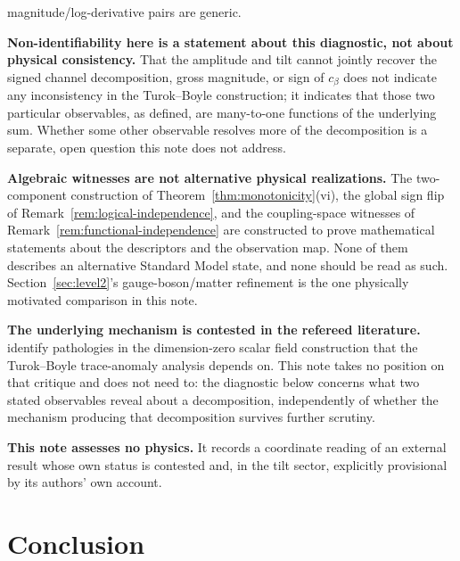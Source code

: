 \documentclass[11pt]{article}
\theoremstyle{definition}
\theoremstyle{remark}
\begin{document}
\begin{description}
magnitude/log-derivative pairs are generic.
\item[\textbf{(L7)}] \textbf{Non-identifiability here is a statement about this diagnostic, not
about physical consistency.} That the amplitude
and tilt cannot jointly recover the signed channel decomposition, gross magnitude, or sign of
$c_\beta$ does not indicate any inconsistency in the Turok--Boyle construction; it indicates that
those two particular observables, as defined, are many-to-one functions of the underlying sum.
Whether some other observable resolves more of the decomposition is a separate, open question this
note does not address.
\item[\textbf{(L8)}] \textbf{Algebraic witnesses are not alternative physical realizations.} The two-component
construction of Theorem~\ref{thm:monotonicity}(vi), the global sign flip of
Remark~\ref{rem:logical-independence}, and the coupling-space witnesses of
Remark~\ref{rem:functional-independence} are constructed to prove mathematical statements about the
descriptors and the observation map. None of them describes an alternative Standard Model state,
and none should be read as such. Section~\ref{sec:level2}'s gauge-boson/matter refinement is the
one physically motivated comparison in this note.
\item[\textbf{(L9)}] \textbf{The underlying mechanism is contested in the refereed literature.} \citet{ClineHell2026}
identify pathologies in the dimension-zero scalar field construction that the Turok--Boyle
trace-anomaly analysis depends on. This note takes no position on that critique and does not need
to: the diagnostic below concerns what two stated observables reveal about a decomposition,
independently of whether the mechanism producing that decomposition survives further scrutiny.
\item[\textbf{(L10)}] \textbf{This note assesses no physics.} It records a coordinate reading of an external result
whose own status is contested and, in the tilt sector, explicitly provisional by its authors' own
account.
\end{description}

\section{Conclusion}
\label{sec:conclusion}
\end{document}
